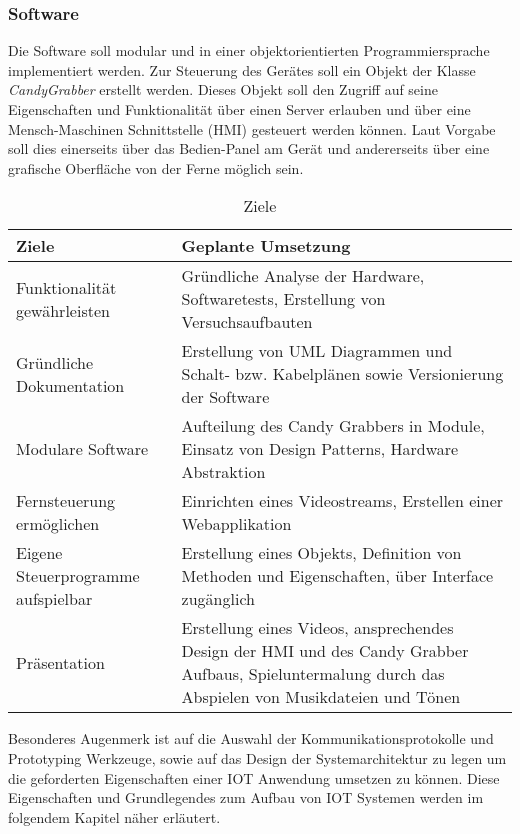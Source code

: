 \documentclass[BMR,Bachelor,ngerman]{twbook}%
\begin{document}
\subsubsection{Software}
Die Software soll modular und in einer objektorientierten Programmiersprache implementiert werden. Zur Steuerung des Gerätes soll ein Objekt der Klasse \emph{CandyGrabber} erstellt werden. Dieses Objekt soll den Zugriff auf seine Eigenschaften und Funktionalität über einen Server erlauben und über eine Mensch-Maschinen Schnittstelle (\ac{HMI}) gesteuert werden können. Laut Vorgabe soll dies einerseits über das Bedien-Panel am Gerät und andererseits über eine grafische Oberfläche von der Ferne möglich sein.
\begin{table}[H]
\caption{Ziele}
\centering
\begin{tabular}{| p{}| p{} |}\hline
\rowcolor[gray]{0.9}Ziele & Geplante Umsetzung \\\hline
Funktionalität gewährleisten & Gründliche Analyse der Hardware, Softwaretests, Erstellung von Versuchsaufbauten\\\hline
Gründliche Dokumentation & Erstellung von UML Diagrammen und Schalt- bzw. Kabelplänen sowie Versionierung der Software\\\hline
Modulare Software & Aufteilung des Candy Grabbers in Module, Einsatz von Design Patterns, Hardware Abstraktion \\\hline
Fernsteuerung ermöglichen & Einrichten eines Videostreams, Erstellen einer Webapplikation \\\hline
Eigene Steuerprogramme aufspielbar & Erstellung eines Objekts, Definition von Methoden und Eigenschaften, über Interface zugänglich\\\hline
Präsentation & Erstellung eines Videos, ansprechendes Design der HMI und des Candy Grabber Aufbaus, Spieluntermalung durch das Abspielen von Musikdateien und Tönen\\\hline
\end{tabular}
\end{table}
Besonderes Augenmerk ist auf die Auswahl der Kommunikationsprotokolle und Prototyping Werkzeuge, sowie auf das Design der Systemarchitektur zu legen um die geforderten Eigenschaften einer \ac{IOT} Anwendung umsetzen zu können. Diese Eigenschaften und Grundlegendes zum Aufbau von \ac{IOT} Systemen werden im folgendem Kapitel näher erläutert.
\end{document}
